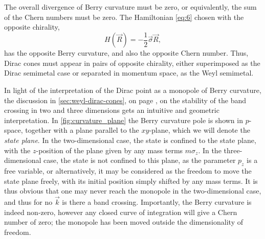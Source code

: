 The overall divergence of Berry curvature must be zero, or equivalently, the sum of the Chern numbers must be zero.
The Hamiltonian \cref{eq:6} chosen with the opposite chirality,
\begin{equation}
  H(\vec{R}) = -\frac{1}{2} \vec{\sigma} \vec{R},
\end{equation}
has the opposite Berry curvature, and also the opposite Chern number.
Thus, Dirac cones must appear in pairs of opposite chirality, either superimposed as the Dirac semimetal case or separated in momentum space, as the Weyl semimetal.

In light of the interpretation of the Dirac point as a monopole of Berry curvature, the discussion in \cref{sec:weyl-dirac-cones}, on page \pageref{sec:stability-of-gap}, on the stability of the band crossing in two and three dimensions gets an intuitive and geometric interpretation.
In \cref{fig:curvature_plane} the Berry curvature pole is shown in $p$-space, together with a plane parallel to the $xy$-plane, which we will denote the \emph{state plane}.
In the two-dimensional case, the state is confined to the state plane, with the $z$-position of the plane given by any mass terms $m \sigma _z$.
In the three-dimensional case, the state is not confined to this plane, as the parameter $p_z$ is a free variable, or alternatively, it may be considered as the freedom to move the state plane freely, with its initial position simply shifted by any mass terms.
It is thus obvious that one may never reach the monopole in the two-dimensional case, and thus for no $\vec{k}$ is there a band crossing.
Importantly, the Berry curvature is indeed non-zero, however any closed  curve of integration will give a Chern number of zero;
the  monopole has been moved outside the dimensionality of freedom.
